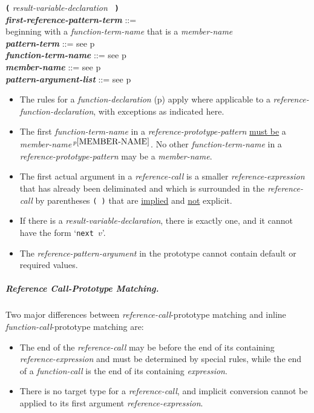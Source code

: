 \documentclass[12pt]{article}
\newcommand{\subsubsubsubsection}[1]{\subparagraph[#1]{#1.}}
\newcommand{\TT}[1]{{\tt \bfseries #1}}
\newcommand{\emkey}[1]{{\em \bfseries #1}}
\newcommand{\pagref}[1]{p\pageref{#1}}
\newcommand{\pagnote}[1]{$\,^{p\pageref{#1}}$}
\newenvironment{indpar}[1][0.3in]%
	{\begin{list}{}%
		     {\setlength{\itemsep}{0in}%
		      \setlength{\topsep}{0in}%
		      \setlength{\parsep}{1ex}%
		      \setlength{\labelwidth}{#1}%
		      \setlength{\leftmargin}{#1}%
		      \addtolength{\leftmargin}{\labelsep}}%
	 \item}%
	{\end{list}}
\begin{document}
\begin{indpar}[0.1in]
    \TT{(} {\em result-variable-declaration}~ \TT{)}
\\[0.5ex]
\emkey{first-reference-pattern-term} ::= \\
\hspace*{2em}{\em pattern-term} beginning with
   a {\em function-term-name} that is a {\em member-name}
\\[0.5ex]
\emkey{pattern-term} ::= see \pagref{PATTERN-TERM}
\\[0.5ex]
\emkey{function-term-name} ::= see \pagref{FUNCTION-TERM-NAME}
\\[0.5ex]
\emkey{member-name} ::= see \pagref{MEMBER-NAME}
\\[0.5ex]
\emkey{pattern-argument-list} ::= see \pagref{PATTERN-ARGUMENT-LIST}
\begin{itemize}
\item
The rules for a {\em function-declaration}
(\pagref{FUNCTION-DECLARATION-RULES})
apply where applicable to a {\em reference-function-declaration},
with exceptions as indicated here.
\item
The first {\em function-term-name} in a {\em reference-prototype-pattern}
\underline{must be} a {\em member-name}\pagnote{MEMBER-NAME}.
No other {\em function-term-name} in a {\em reference-prototype-pattern}
may be a {\em member-name}.
\item
The first actual argument in a {\em reference-call} is a
smaller {\em reference-expression} that has already been deliminated
and which is surrounded in the {\em reference-call} by
parentheses {\tt (~)} that are \underline{implied} and \underline{not} explicit.
\item
If there is a {\em result-variable-declaration}, there is exactly one,
and it cannot have the form `{\tt next $v$}'.
\item
The {\em reference-pattern-argument} in the prototype cannot
contain default or required values.
\end{itemize}
\end{indpar}

\subsubsubsubsection{Reference Call-Prototype Matching}
\label{REFERENCE-CALL-PROTOTYPE-MATCHING}

Two major differences between {\em refer\-ence-call}-prototype
matching and inline {\em function-call}-prototype matching are:
\begin{itemize}
\item
The end of the {\em reference-call} may be before the end
of its containing {\em reference-expres\-sion} and must be
determined by special rules, while the
end of a {\em function-call} is the end of its containing
{\em expression}.
\item
There is no target type for a {\em reference-call}, and
implicit conversion cannot be applied to its first argument
{\em reference-expression}.
\end{itemize}
\end{document}
